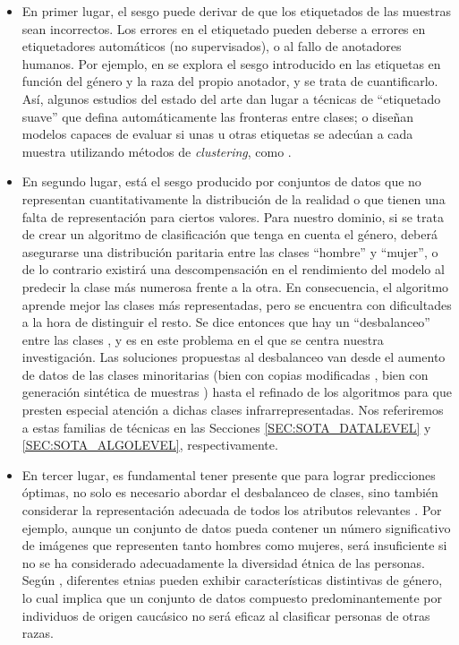 \begin{itemize}
    \fontsize{11pt}{12pt}\selectfont
    \item En primer lugar, el sesgo puede derivar de que los etiquetados de las muestras sean incorrectos. Los errores en el etiquetado pueden deberse a errores en etiquetadores automáticos (no supervisados), o al fallo de anotadores humanos. Por ejemplo, en \citet{kafkalias2022bias} se explora el sesgo introducido en las etiquetas en función del género y la raza del propio anotador, y se trata de cuantificarlo. Así, algunos estudios del estado del arte dan lugar a técnicas de ``etiquetado suave'' \cite{han2020toward} que defina automáticamente las fronteras entre clases; o diseñan modelos capaces de evaluar si unas u otras etiquetas se adecúan a cada muestra utilizando métodos de \textit{clustering}, como \citet{aka2021measuring}.

    \item En segundo lugar, está el sesgo producido por conjuntos de datos que no representan cuantitativamente la distribución de la realidad o que tienen una falta de representación para ciertos valores. Para nuestro dominio, si se trata de crear un algoritmo de clasificación que tenga en cuenta el género, deberá asegurarse una distribución paritaria entre las clases ``hombre'' y ``mujer'', o de lo contrario existirá una descompensación en el rendimiento del modelo al predecir la clase más numerosa frente a la otra. En consecuencia, el algoritmo aprende mejor las clases más representadas, pero se encuentra con dificultades a la hora de distinguir el resto. Se dice entonces que hay un ``desbalanceo'' entre las clases \cite{nafi2020addressing}, y es en este problema en el que se centra nuestra investigación. Las soluciones propuestas al desbalanceo van desde el aumento de datos de las clases minoritarias (bien con copias modificadas \cite{johnson2019survey}, bien con generación sintética de muestras \cite{GoogleGAN,arjovsky2017wasserstein,he2008adasyn,chawla2002smote}) hasta el refinado de los algoritmos para que presten especial atención a dichas clases infrarrepresentadas. Nos referiremos a estas familias de técnicas en las Secciones \ref{SEC:SOTA_DATALEVEL} y \ref{SEC:SOTA_ALGOLEVEL}, respectivamente.

    \item En tercer lugar, es fundamental tener presente que para lograr predicciones óptimas, no solo es necesario abordar el desbalanceo de clases, sino también considerar la representación adecuada de todos los atributos relevantes \cite{wu2020gender,vallimeena2019cnn,yilmaz2021evolutionary}. Por ejemplo, aunque un conjunto de datos pueda contener un número significativo de imágenes que representen tanto hombres como mujeres, será insuficiente si no se ha considerado adecuadamente la diversidad étnica de las personas. Según \citet{loo2018influence}, diferentes etnias pueden exhibir características distintivas de género, lo cual implica que un conjunto de datos compuesto predominantemente por individuos de origen caucásico no será eficaz al clasificar personas de otras razas.


\end{itemize}
